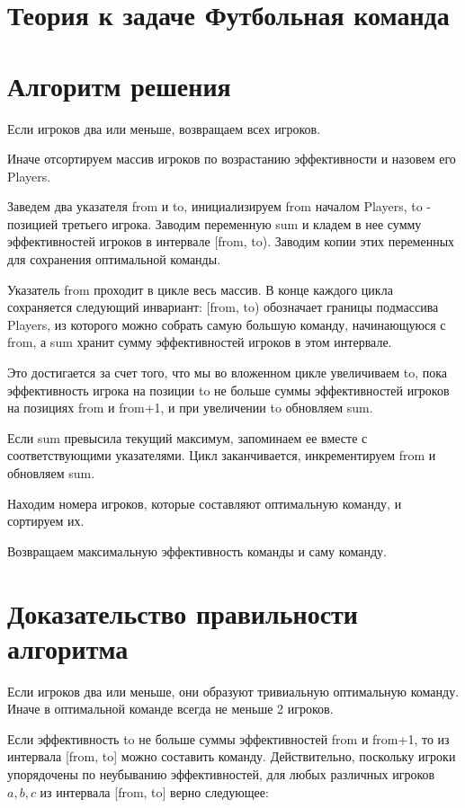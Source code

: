 \documentclass{article}
\begin{document}
\section*{Теория к задаче Футбольная команда}
\section{Алгоритм решения}

Если игроков два или меньше, возвращаем всех игроков.

Иначе отсортируем массив игроков по возрастанию эффективности и назовем его Players.

Заведем два указателя from и to, инициализируем from началом Players, to - позицией третьего игрока. Заводим переменную sum и кладем в нее сумму эффективностей игроков в интервале [from, to). Заводим копии этих переменных для сохранения оптимальной команды.

Указатель from проходит в цикле весь массив. В конце каждого цикла сохраняется следующий инвариант: [from, to) обозначает границы подмассива Players, из которого можно собрать самую большую команду, начинающуюся с from, а sum хранит сумму эффективностей игроков в этом интервале.

Это достигается за счет того, что мы во вложенном цикле увеличиваем to, пока эффективность игрока на позиции to не больше суммы эффективностей игроков на позициях from и from+1, и при увеличении to обновляем sum.

Если sum превысила текущий максимум, запоминаем ее вместе с соответствующими указателями. Цикл заканчивается, инкрементируем from и обновляем sum.

Находим номера игроков, которые составляют оптимальную команду, и сортируем их.

Возвращаем максимальную эффективность команды и саму команду. 

\section{Доказательство правильности алгоритма}

Если игроков два или меньше, они образуют тривиальную оптимальную команду. Иначе в оптимальной команде всегда не меньше 2 игроков.

Если эффективность to не больше суммы эффективностей from и from+1, то из интервала [from, to] можно составить команду. Действительно, поскольку игроки упорядочены по неубыванию эффективностей, для любых различных игроков $a, b, c$ из интервала [from, to] верно следующее:
\end{document}
